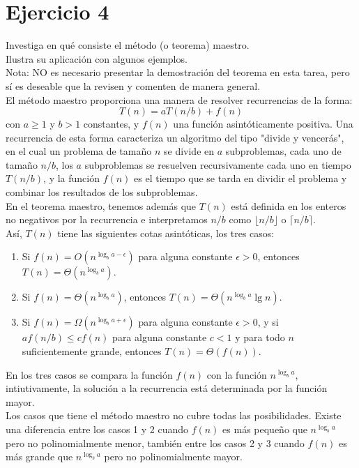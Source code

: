 \documentclass[12pt]{article}
\begin{document}
\section*{Ejercicio 4}
Investiga en qué consiste el método (o teorema) maestro.\\
Ilustra su aplicación con algunos ejemplos.\\
Nota: NO es necesario presentar la demostración del teorema en esta tarea, pero sí es deseable que la revisen y comenten de manera general.\\
El método maestro proporciona una manera de resolver recurrencias de la forma:
\[
    T(n) = aT\left(n/b\right) + f(n)
\]
con $a \geq 1$ y $b > 1$ constantes, y $f(n)$ una función asintóticamente positiva. Una recurrencia de esta forma caracteriza un algoritmo del tipo "divide y vencerás", en el cual un problema de tamaño $n$ se divide en $a$ subproblemas, cada uno de tamaño $n/b$, los $a$ subproblemas se resuelven recursivamente cada uno en tiempo $T\left(n/b\right)$, y la función $f(n)$ es el tiempo que se tarda en dividir el problema y combinar los resultados de los subproblemas.\\
En el teorema maestro, tenemos además que $T(n)$ está definida en los enteros no negativos por la recurrencia e interpretamos $n/b$ como $\lfloor n/b \rfloor$ o $\lceil n/b \rceil$.\\
Así, $T(n)$ tiene las siguientes cotas asintóticas, los tres casos:
\begin{enumerate}
    \item Si $f(n) = O(n^{\log_b a - \epsilon})$ para alguna constante $\epsilon > 0$, entonces $T(n) = \Theta(n^{\log_b a})$.
    \item Si $f(n) = \Theta(n^{\log_b a})$, entonces $T(n) = \Theta(n^{\log_b a} \lg n)$.
    \item Si $f(n) = \Omega(n^{\log_b a + \epsilon})$ para alguna constante $\epsilon > 0$, y si $af(n/b) \leq cf(n)$ para alguna constante $c < 1$ y para todo $n$ suficientemente grande, entonces $T(n) = \Theta(f(n))$.
\end{enumerate}
En los tres casos se compara la función $f(n)$ con la función $n^{\log_b a}$, intiutivamente, la solución a la recurrencia está determinada por la función mayor.\\
Los casos que tiene el método maestro no cubre todas las posibilidades. Existe una diferencia entre los casos 1 y 2 cuando $f(n)$ es más pequeño que $n^{\log_b a}$ pero no polinomialmente menor, también entre los casos 2 y 3 cuando $f(n)$ es más grande que $n^{\log_b a}$ pero no polinomialmente mayor.\\
\end{document}

